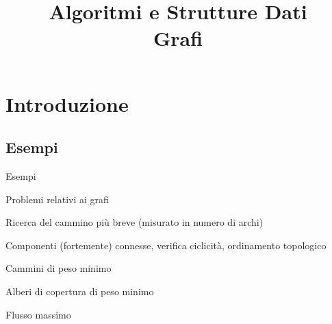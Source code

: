 

\usepackage{blkarray, bigstrut}
\usepackage{listings}

\newcommand\topstrut[1][1.2ex]{\setlength\bigstrutjot{#1}{\bigstrut[t]}}
\newcommand\botstrut[1][0.9ex]{\setlength\bigstrutjot{#1}{\bigstrut[b]}}


\renewcommand{\mmark}{\mathit{visited}}
\renewcommand{\hascycle}{\mathit{hasCycle}}

\title[ASD - Grafi]{\textbf{Algoritmi e Strutture Dati}\\[24pt]
Grafi}

\graphicspath{{figs/09/}}





\FrameTitle{}

\FrameContent

\section{Introduzione}

\subsection{Esempi}

\begin{frame}{Esempi}
\vspace{-12pt}
\centering
{}
\end{frame}

\begin{frame}{Problemi relativi ai grafi}
\BIL
\item Ricerca del cammino più breve (misurato in numero di archi)
\item Componenti (fortemente) connesse, verifica ciclicità, ordinamento topologico
\EIL

\medskip
{}
\BIL
\item Cammini di peso minimo
\item Alberi di copertura di peso minimo
\item Flusso massimo
\EIL


\end{frame}

